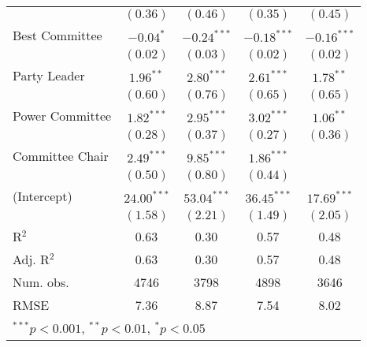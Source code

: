 \documentclass[12pt]{article}
\begin{document}
\begin{table}[H]
\begin{center}
\begin{tabular}{l c c c c }
			& $(0.36)$      & $(0.46)$      & $(0.35)$      & $(0.45)$      \\
			Best Committee         & $-0.04^{*}$   & $-0.24^{***}$ & $-0.18^{***}$ & $-0.16^{***}$ \\
			& $(0.02)$      & $(0.03)$      & $(0.02)$      & $(0.02)$      \\
			Party Leader                 & $1.96^{**}$   & $2.80^{***}$  & $2.61^{***}$  & $1.78^{**}$   \\
			& $(0.60)$      & $(0.76)$      & $(0.65)$      & $(0.65)$      \\
			Power Committee                & $1.82^{***}$  & $2.95^{***}$  & $3.02^{***}$  & $1.06^{**}$   \\
			& $(0.28)$      & $(0.37)$      & $(0.27)$      & $(0.36)$      \\
			Committee Chair                  & $2.49^{***}$  & $9.85^{***}$  & $1.86^{***}$  &               \\
			& $(0.50)$      & $(0.80)$      & $(0.44)$      &               \\
			(Intercept)            & $24.00^{***}$ & $53.04^{***}$ & $36.45^{***}$ & $17.69^{***}$ \\
			& $(1.58)$      & $(2.21)$      & $(1.49)$      & $(2.05)$      \\
			\hline
			R$^2$                  & 0.63          & 0.30          & 0.57          & 0.48          \\
			Adj. R$^2$             & 0.63          & 0.30          & 0.57          & 0.48          \\
			Num. obs.              & 4746          & 3798          & 4898          & 3646          \\
			RMSE                   & 7.36          & 8.87          & 7.54          & 8.02          \\
			\hline
			\multicolumn{5}{l}{\scriptsize{$^{***}p<0.001$, $^{**}p<0.01$, $^*p<0.05$}}
		\end{tabular}
	\end{center}
\end{table}
\end{document}
